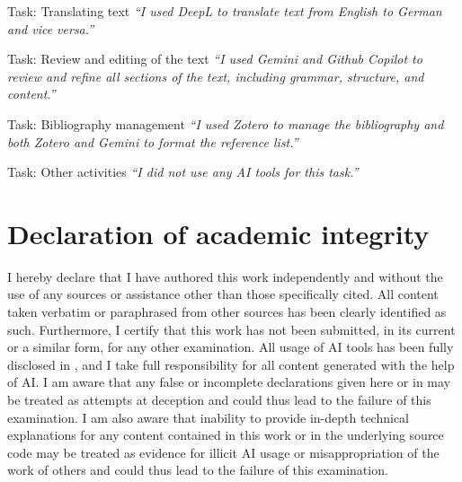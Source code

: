 \documentclass[11pt]{article}
\begin{document}
\vspace{.25em}

\begin{answerbox}{Task: Translating text}
     \textit{``I used DeepL to translate text from English to German and vice versa.''}
\end{answerbox}

\vspace{.25em}

\begin{answerbox}{Task: Review and editing of the text}
     \textit{``I used Gemini and Github Copilot to review and refine all sections of the text, including grammar, structure, and content.''}
\end{answerbox}

\vspace{.25em}

\begin{answerbox}{Task: Bibliography management}
     \textit{``I used Zotero to manage the bibliography and both Zotero and Gemini to format the reference list.''}
\end{answerbox}

\vspace{.25em}

\begin{answerbox}{Task: Other activities}
     \textit{``I did not use any AI tools for this task.''}
\end{answerbox}


\clearpage

\section{Declaration of academic integrity}\label{sec:declaration}

I hereby declare that I have authored this work independently and without the use of any sources or assistance other than those specifically cited. All content taken verbatim or paraphrased from other sources has been clearly identified as such. Furthermore, I certify that this work has not been submitted, in its current or a similar form, for any other examination. All usage of AI tools has been fully disclosed in , and I take full responsibility for all content generated with the help of AI. I am aware that any false or incomplete declarations given here or in  may be treated as attempts at deception and could thus lead to the failure of this examination. I am also aware that inability to provide in-depth technical explanations for any content contained in this work or in the underlying source code may be treated as evidence for illicit AI usage or misappropriation of the work of others and could thus lead to the failure of this examination.

\end{document}
